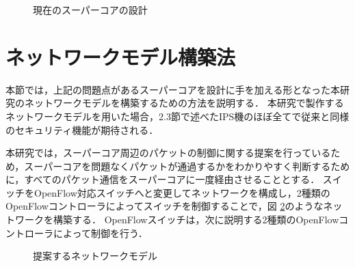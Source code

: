 \begin{figure}[tb]
	\begin{center}
		\caption{現在のスーパーコアの設計}
		\label{fig:3-0}
	\end{center}
\end{figure}

\section{ネットワークモデル構築法}

本節では，上記の問題点があるスーパーコアを設計に手を加える形となった本研究のネットワークモデルを構築するための方法を説明する．
本研究で製作するネットワークモデルを用いた場合，2.3節で述べたIPS機のほぼ全てで従来と同様のセキュリティ機能が期待される．

本研究では，スーパーコア周辺のパケットの制御に関する提案を行っているため，スーパーコアを問題なくパケットが通過するかをわかりやすく判断するために，すべてのパケット通信をスーパーコアに一度経由させることとする．
スイッチをOpenFlow対応スイッチへと変更してネットワークを構成し，2種類のOpenFlowコントローラによってスイッチを制御することで，図 \ref{fig:3-1}のようなネットワークを構築する．
OpenFlowスイッチは，次に説明する2種類のOpenFlowコントローラによって制御を行う．

\begin{figure}[tb]
	\begin{center}
		\caption{提案するネットワークモデル}
		\label{fig:3-1}
	\end{center}
\end{figure}

